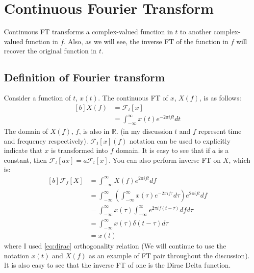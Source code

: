 \documentclass[letterpaper, 11pt]{article}
\newcommand{\fint}{\int_{-\infty}^{\infty}} %
\newcommand{\fourier}[2]{\mathcal{F}_{#1}[#2]} %
\newcommand{\ft}[3]{\fint #2 e^{-2\pi i#3#1} d#1} %
\newcommand{\ift}[3]{\fint #2 e^{2\pi i#1#3} d#1} %
\numberwithin{equation}{section}
\numberwithin{figure}{section}
\numberwithin{table}{section}
\begin{document}
\clearpage
\section{Continuous Fourier Transform}
Continuous FT transforms a complex-valued function in \(t\) to another complex-valued function in \(f\). Also, as we will see, the inverse FT of the function in \(f\) will recover the original function in \(t\). 

\subsection{Definition of Fourier transform}
Consider a function of \(t\), \(x(t)\). The continuous FT of \(x\), \(X(f)\), is as follows:
\begin{equation}
	\begin{aligned}[b]
		X(f)	&=\fourier{t}{x} \\
			&=\ft{t}{x(t)}{f}
	\end{aligned}
\end{equation}
The domain of \(X(f)\), \(f\), is also in \(\mathbb{R}\). (in my discussion \(t\) and \(f\) represent time and frequency respectively). \(\fourier{t}{x}(f)\) notation can be used to explicitly indicate that \(x\) is transformed into \(f\) domain. It is easy to see that if \(a\) is a constant, then \(\fourier{t}{ax} = a \fourier{t}{x}\). You can also perform inverse FT on \(X\), which is:
\begin{equation}
	\begin{aligned}[b]
		\fourier{f}{X}	&= \ift{f}{X(f)}{t} \\
				&= \ift{f}{\left ( \ft{\tau}{x(\tau)}{f}\right )}{t} \\
				&= \fint x(\tau) \fint e^{2\pi if(t - \tau)} df d\tau \\
				&= \fint x(\tau) \delta (t - \tau) d\tau \\
				&= x(t)
	\end{aligned}
\end{equation}
where I used \eqref{eq:dirac} orthogonality relation (We will continue to use the notation \(x(t)\) and \(X(f)\) as an example of FT pair throughout the discussion). It is also easy to see that the inverse FT of one is the Dirac Delta function.

\end{document}
